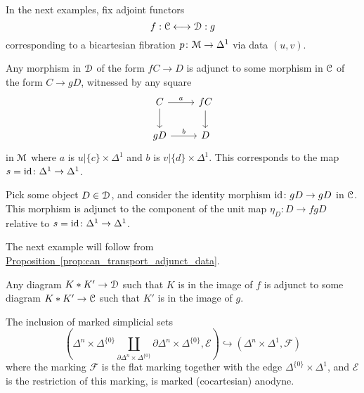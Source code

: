 \documentclass[main.tex]{subfiles}
\begin{document}
In the next examples, fix adjoint functors
\begin{equation*}
  f : \mathcal{C} \longleftrightarrow \mathcal{D} : g
\end{equation*}
corresponding to a bicartesian fibration $p\colon \mathcal{M} \to \Delta^{1}$ via data $(u, v)$.

\begin{example}
  Any morphism in $\mathcal{D}$ of the form $fC \to D$ is adjunct to some morphism in $\mathcal{C}$ of the form $C \to gD$, witnessed by any square
  \begin{equation*}
    \begin{tikzcd}
      C
      \arrow[r, "a"]
      \arrow[d]
      & fC
      \arrow[d]
      \\
      gD
      \arrow[r, "b"]
      & D
    \end{tikzcd}
  \end{equation*}
  in $\mathcal{M}$ where $a$ is $u|\{c\} \times \Delta^{1}$ and $b$ is $v|\{d\} \times \Delta^{1}$. This corresponds to the map $s = \mathrm{id}\colon \Delta^{1} \to \Delta^{1}$.
\end{example}

\begin{example}
  Pick some object $D \in \mathcal{D}$, and consider the identity morphism $\mathrm{id}\colon gD \to gD$ in $\mathcal{C}$. This morphism is adjunct to the component of the unit map $\eta_{D}\colon D \to fgD$ relative to $s = \mathrm{id}\colon \Delta^{1} \to \Delta^{1}$.
\end{example}

The next example will follow from \hyperref[prop:can_transport_adjunct_data]{Proposition~\ref*{prop:can_transport_adjunct_data}}.

\begin{example}
  Any diagram $K \ast K' \to \mathcal{D}$ such that $K$ is in the image of $f$ is adjunct to some diagram $K \ast K' \to \mathcal{C}$ such that $K'$ is in the image of $g$.
\end{example}

\begin{lemma}
  \label{lemma:left_cylinder_inclusion_marked_anodyne}
  The inclusion of marked simplicial sets
  \begin{equation}
    \label{eq:cocartesian_anodyne_morphism}
    \left( \Delta^{n} \times \Delta^{\{0\}} \coprod_{\partial \Delta^{n} \times \Delta^{\{0\}}} \partial \Delta^{n} \times \Delta^{\{0\}}, \mathcal{E} \right) \hookrightarrow (\Delta^{n} \times \Delta^{1}, \mathcal{F})
  \end{equation}
  where the marking $\mathcal{F}$ is the flat marking together with the edge $\Delta^{\{0\}} \times \Delta^{1}$, and $\mathcal{E}$ is the restriction of this marking, is marked (cocartesian) anodyne.
\end{lemma}
\end{document}
